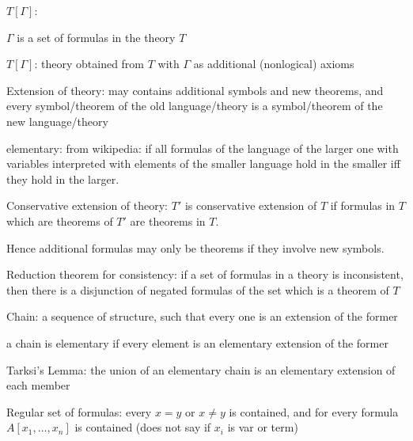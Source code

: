 \begin{description}
	\item{$T[\Gamma]$:}

$\Gamma$ is a set of formulas in the theory $T$

$T[\Gamma]$: theory obtained from $T$ with $\Gamma$ as additional (nonlogical) axioms


	\item{Extension of theory:}
		may contains additional symbols and new theorems, and every symbol/theorem of the old language/theory is a symbol/theorem of the new language/theory

		elementary: from wikipedia: if all formulas of the language of the larger one with variables interpreted with elements of the smaller language hold in the smaller iff they hold in the larger.

	\item{Conservative extension of theory:}
		$T'$ is conservative extension of $T$ if formulas in $T$ which are theorems of $T'$ are theorems in $T$.

		Hence additional formulas may only be theorems if they involve new symbols.

	\item{Reduction theorem for consistency:}
		if a set of formulas in a theory is inconsistent, then there is a disjunction of negated formulas of the set which is a theorem of $T$

	\item{Chain:}
		a sequence of structure, such that every one is an extension of the former

		a chain is elementary if every element is an elementary extension of the former

	\item{Tarksi's Lemma:}
		the union of an elementary chain is an elementary extension of each member

	\item{Regular set of formulas:} 
		every $x=y$ or $x\neq y$ is contained, and for every formula $A[x_1, \dots, x_n]$ is contained (does not say if $x_i$ is var or term)

\end{description}

